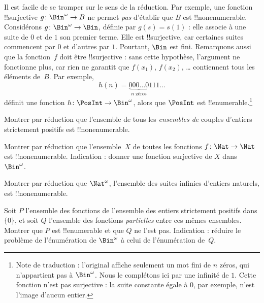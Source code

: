\documentclass[11pt,a4paper,openany]{memoir}
\begin{document}
\begin{explain}
Il est facile de se tromper sur le sens de la réduction. Par exemple,
une fonction !!{surjective} $g \colon \Bin^\omega \to B$ ne permet
\emph{pas} d'établir que $B$ est !!{nonenumerable}. Considérons
$g \colon \Bin^\omega \to \Bin$, définie par $g(s) = s(1)$ : elle
associe à une suite de $0$ et de $1$ son premier terme. Elle est
!!{surjective}, car certaines suites commencent par $0$ et d'autres
par $1$. Pourtant, $\Bin$ est fini. Remarquons aussi que la
fonction~$f$ doit être !!{surjective} : sans cette hypothèse,
l'argument ne fonctionne plus, car rien ne garantit que $f(x_1)$,
$f(x_2)$, \dots{} contiennent tous les éléments de~$B$. Par exemple,
\[
h(n) = \underbrace{000\dots0}_{\text{$n$ zéros}}111\dots
\]
définit une fonction $h\colon \PosInt \to \Bin^\omega$, alors que
$\PosInt$ est !!{enumerable}.\footnote{Note de traduction : l'original
affiche seulement un mot fini de $n$ zéros, qui n'appartient pas à
$\Bin^\omega$. Nous le complétons ici par une infinité de $1$.
Cette fonction n'est pas surjective : la suite constante égale à $0$,
par exemple, n'est l'image d'aucun entier.}
\end{explain}

\begin{prob}
Montrer par réduction que l'ensemble de tous les \emph{ensembles de}
couples d'entiers strictement positifs est !!{nonenumerable}.
\end{prob}

\begin{prob}\label{sfr:siz:red:prob:nat-nat}
  Montrer par réduction que l'ensemble~$X$ de toutes les fonctions
  $f\colon \Nat \to \Nat$ est !!{nonenumerable}. Indication : donner
  une fonction surjective de $X$ dans~$\Bin^\omega$.
\end{prob}

\begin{prob}
Montrer par réduction que $\Nat^\omega$, l'ensemble des suites
infinies d'entiers naturels, est !!{nonenumerable}.
\end{prob}

\begin{prob}
Soit $P$ l'ensemble des fonctions de l'ensemble des entiers
strictement positifs dans $\{0\}$, et soit $Q$ l'ensemble des
fonctions \emph{partielles} entre ces mêmes ensembles. Montrer que
$P$ est !!{enumerable} et que $Q$ ne l'est pas. Indication : réduire
le problème de l'énumération de $\Bin^\omega$ à celui de
l'énumération de~$Q$.
\end{prob}
\end{document}
